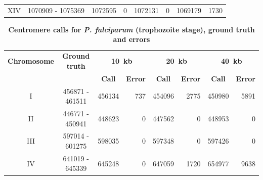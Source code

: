 \begin{table}[ht!]
\begin{center}
\begin{tabular}{c | c  r  r  r  r r r}
XIV & \num[group-separator={\,}]{1070909} - \num[group-separator={\,}]{1075369} & \num[group-separator={\,}]{1072595} & \small{\num[group-separator={\,}]{0}}  & \num[group-separator={\,}]{1072131} & \small{\num[group-separator={\,}]{0}}  & \num[group-separator={\,}]{1069179} & \small{\num[group-separator={\,}]{1730}}  \\
\end{tabular}
\end{center}
\label{supptable:rings_results}
\end{table}

\clearpage

\begin{table}[ht!]
\caption{\textbf{Centromere calls for \textit{P. falciparum} (trophozoite stage),
ground truth and errors}}
\small
\vspace{10pt}
\begin{center}
\begin{tabular}{c | c  r  r  r  r r r}
\textbf{Chromosome}  & \textbf{Ground truth} & \multicolumn{2}{c}{\textbf{10~kb}} & \multicolumn{2}{c}{\textbf{20~kb}} & \multicolumn{2}{c}{\textbf{40~kb}} \\
  &   &  \multicolumn{1}{c}{\textbf{Call}} &  \multicolumn{1}{c}{\textbf{Error}} &  \multicolumn{1}{c}{\textbf{Call}} &  \multicolumn{1}{c}{\textbf{Error}} &  \multicolumn{1}{c}{\textbf{Call}} &  \multicolumn{1}{c}{\textbf{Error}} \\
\hline
I & \num[group-separator={\,}]{456871} - \num[group-separator={\,}]{461511} & \num[group-separator={\,}]{456134} & \small{\num[group-separator={\,}]{737}}  & \num[group-separator={\,}]{454096} & \small{\num[group-separator={\,}]{2775}}  & \num[group-separator={\,}]{450980} & \small{\num[group-separator={\,}]{5891}}  \\
II & \num[group-separator={\,}]{446771} - \num[group-separator={\,}]{450941} & \num[group-separator={\,}]{448623} & \small{\num[group-separator={\,}]{0}}  & \num[group-separator={\,}]{447562} & \small{\num[group-separator={\,}]{0}}  & \num[group-separator={\,}]{448953} & \small{\num[group-separator={\,}]{0}}  \\
III & \num[group-separator={\,}]{597014} - \num[group-separator={\,}]{601275} & \num[group-separator={\,}]{598035} & \small{\num[group-separator={\,}]{0}}  & \num[group-separator={\,}]{597348} & \small{\num[group-separator={\,}]{0}}  & \num[group-separator={\,}]{597426} & \small{\num[group-separator={\,}]{0}}  \\
IV & \num[group-separator={\,}]{641019} - \num[group-separator={\,}]{645339} & \num[group-separator={\,}]{645248} & \small{\num[group-separator={\,}]{0}}  & \num[group-separator={\,}]{647059} & \small{\num[group-separator={\,}]{1720}}  & \num[group-separator={\,}]{654977} & \small{\num[group-separator={\,}]{9638}}  \\

\end{tabular}
\end{center}
\end{table}
